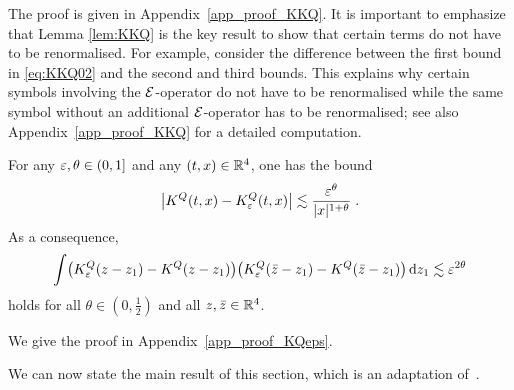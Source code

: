 \documentclass[reqno,11pt]{article}
\def\KQ{K^Q}
\begin{document}
The proof is given in Appendix~\ref{app_proof_KKQ}. It is important to emphasize
that Lemma \ref{lem:KKQ} is the key result to show that certain terms do not
have to be renormalised. For example, consider the difference between the first
bound in \eqref{eq:KKQ02} and the second and third bounds. This explains why
certain symbols involving the ${\mathcal E}$-operator do not have to be renormalised
while the same symbol without an additional ${\mathcal E}$-operator has to be
renormalised; see also Appendix~\ref{app_proof_KKQ} for a detailed computation.

\begin{lemma}
\label{lem:KQeps}
For any $\varepsilon,\theta\in(0,1]$ and any $(t,x)\in\mathbb{R}^4$, one has the bound  
\begin{equation}
\label{eq:KQeps01} 
  \bigabs{\KQ(t,x) - \KQ_\eps(t,x)}
 \lesssim \frac{\eps^\theta}{\abs{x}^{1+\theta}}\;.
\end{equation} 
As a consequence, 
\begin{equation}
\label{eq:KQeps02} 
\int \bigpar{\KQ_\eps(z-z_1) - \KQ(z-z_1)} 
\bigpar{\KQ_\eps(\bar z-z_1) - \KQ(\bar z-z_1)} \6z_1  
\lesssim \eps^{2\theta}
\end{equation}
holds for all  $\theta\in(0,\frac12)$ and all $z, \bar z\in\mathbb{R}^4$.
\end{lemma}

We give the proof in Appendix~\ref{app_proof_KQeps}. 

We can now state the main result of this section, which is an adaptation
of~\cite[Thm.~10.22]{Hairer2014}. 
\end{document}
